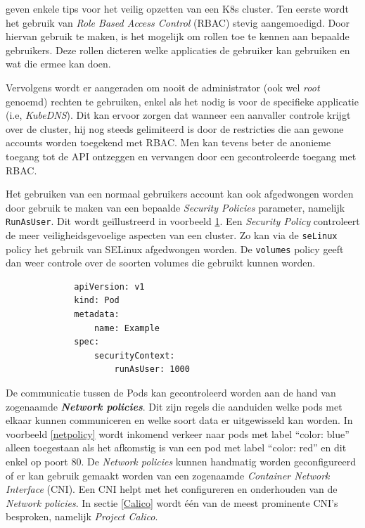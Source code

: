 \textcite{Rice2019, Lewis2019} geven enkele tips voor het veilig opzetten van een K8s cluster. Ten eerste wordt het gebruik van \textit{Role Based Access Control} (RBAC) stevig aangemoedigd. Door hiervan gebruik te maken, is het mogelijk om rollen toe te kennen aan bepaalde gebruikers. Deze rollen dicteren welke applicaties de gebruiker kan gebruiken en wat die ermee kan doen.

Vervolgens wordt er aangeraden om nooit de administrator (ook wel \textit{root} genoemd) rechten te gebruiken, enkel als het nodig is voor de specifieke applicatie (i.e, \textit{KubeDNS}). Dit kan ervoor zorgen dat wanneer een aanvaller controle krijgt over de cluster, hij nog steeds gelimiteerd is door de restricties die aan gewone accounts worden toegekend met RBAC. Men kan tevens beter de anonieme toegang tot de API ontzeggen en vervangen door een gecontroleerde toegang met RBAC.

Het gebruiken van een normaal gebruikers account kan ook afgedwongen worden door gebruik te maken van een bepaalde \textit{Security Policies} parameter, namelijk \verb|RunAsUser|. Dit wordt geïllustreerd in voorbeeld \ref{runasuser}. Een \textit{Security Policy} controleert de meer veiligheidsgevoelige aspecten van een cluster. Zo kan via de \verb|seLinux| policy het gebruik van SELinux afgedwongen worden. De \verb|volumes| policy geeft dan weer controle over de soorten volumes die gebruikt kunnen worden.

\begin{figure}[h!] \label{runasuser}
    \begin{verbatim}
        apiVersion: v1
        kind: Pod
        metadata:
            name: Example
        spec:
            securityContext:
                runAsUser: 1000
    \end{verbatim}
\end{figure}

De communicatie tussen de Pods kan gecontroleerd worden aan de hand van zogenaamde \textbf{\textit{Network policies}}. Dit zijn regels die aanduiden welke pods met elkaar kunnen communiceren en welke soort data er uitgewisseld kan worden. In voorbeeld \ref{netpolicy} wordt inkomend verkeer naar pods met label ``color: blue'' alleen toegestaan als het afkomstig is van een pod met label ``color: red'' en dit enkel op poort 80. De \textit{Network policies} kunnen handmatig worden geconfigureerd of er kan gebruik gemaakt worden van een zogenaamde \textit{Container Network Interface} (CNI). Een CNI helpt met het configureren en onderhouden van de \textit{Network policies}. In sectie \ref{Calico} wordt één van de meest prominente CNI's besproken, namelijk \textit{Project Calico}.

